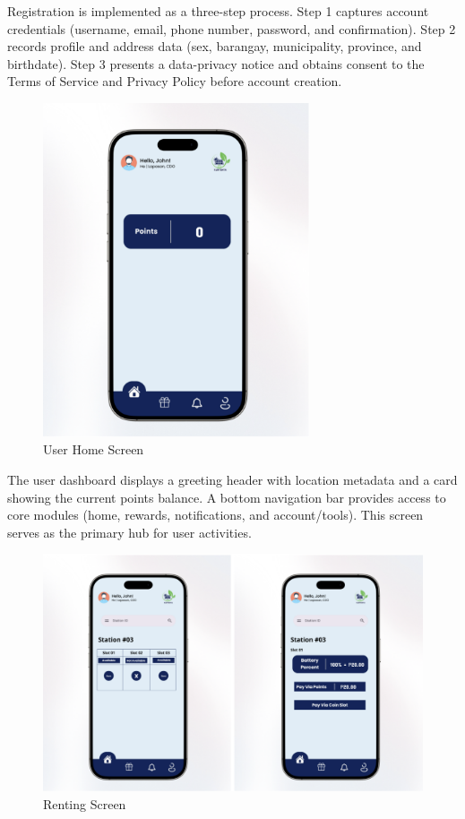 {  Registration is implemented as a three-step process. Step 1 captures account credentials (username, email, phone number, password, and confirmation). Step 2 records profile and address data (sex, barangay, municipality, province, and birthdate). Step 3 presents a data-privacy notice and obtains consent to the Terms of Service and Privacy Policy before account creation.
  
    \begin{figure}[H]
  	\centering
  	\caption{User Home Screen}
  	\label{fig:user home}
  	\includegraphics[width=0.7\textwidth]{figures/home.png}
  \end{figure}
  
  The user dashboard displays a greeting header with location metadata and a card showing the current points balance. A bottom navigation bar provides access to core modules (home, rewards, notifications, and account/tools). This screen serves as the primary hub for user activities.
  
    \begin{figure}[H]
  	\centering
  	\caption{Renting  Screen}
  	\label{fig:renting}
  	\includegraphics[width=1\textwidth]{figures/renting.png}
  \end{figure}
  
}
